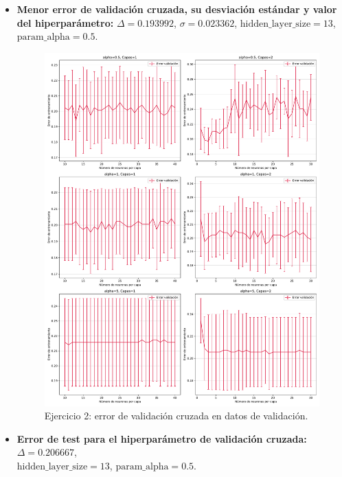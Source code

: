 \documentclass[11pt]{article}
\begin{document}
\begin{itemize}
    \item \textbf{Menor error de validación cruzada, su desviación estándar y valor del hiperparámetro:} $\Delta = 0.193992$, $\sigma = 0.023362$, $\text{hidden\_layer\_size} = 13$, $\text{param\_alpha} = 0.5$.
    \begin{figure}[h]
    \centering
    \includegraphics[width=\textwidth]{fotos/ej2_1.pdf}
    \caption{Ejercicio 2: error de validación cruzada en datos de validación.}
    \end{figure}
    \item \textbf{Error de test para el hiperparámetro de validación cruzada:} $\Delta = 0.206667$, \\ $\text{hidden\_layer\_size} = 13$, $\text{param\_alpha} = 0.5$.
    \begin{figure}[h]
    \centering

\end{figure}
\end{itemize}
\end{document}

